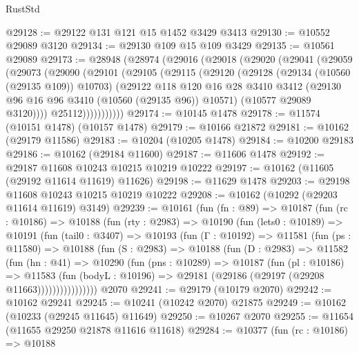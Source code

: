 \begin{lexlean}{RustStd}
\begin{coremodule}
@29128 := @29122 @131 @121 @15 @1452 @3429 @3413
@29130 := @10552 @29089 @3120
@29134 := @29130 @109 @15 @109 @3429
@29135 := @10561 @29089
@29173 := @28948
    (@28974
      (@29016
        (@29018
          (@29020
            (@29041
              (@29059
                (@29073
                  (@29090
                    (@29101
                      (@29105
                        (@29115
                          (@29120
                            (@29128
                              (@29134 (@10560 (@29135 @109)) @10703)
                              (@29122
                                @118
                                @120
                                @16
                                @28
                                @3410
                                @3412
                                (@29130 @96 @16 @96 @3410 (@10560 (@29135 @96)) @10571)
                                (@10577 @29089 @3120))))
                          @25112)))))))))))
@29174 := @10145 @1478
@29178 := @11574 (@10151 @1478) (@10157 @1478)
@29179 := @10166 @21872
@29181 := @10162 (@29179 @11586)
@29183 := @10204 (@10205 @1478)
@29184 := @10200 @29183
@29186 := @10162 (@29184 @11600)
@29187 := @11606 @1478
@29192 := @29187 @11608 @10243 @10215 @10219 @10222
@29197 := @10162 (@11605 (@29192 @11614 @11619) @11626)
@29198 := @11629 @1478
@29203 := @29198 @11608 @10243 @10215 @10219 @10222
@29208 := @10162 (@10292 (@29203 @11614 @11619) @3149)
@29239 := @10161
    (fun (fn : @89) =>
    @10187
      (fun (rc : @10186) =>
      @10188
        (fun (rty : @2983) =>
        @10190
          (fun (lets0 : @10189) =>
          @10191
            (fun (tail0 : @3407) =>
            @10193
              (fun (Γ : @10192) =>
              @11581
                (fun (ps : @11580) =>
                @10188
                  (fun (S : @2983) =>
                  @10188
                    (fun (D : @2983) =>
                    @11582
                      (fun (hn : @41) =>
                      @10290
                        (fun (pns : @10289) =>
                        @10187
                          (fun (pl : @10186) =>
                          @11583
                            (fun (bodyL : @10196) =>
                            @29181 (@29186 (@29197 (@29208 @11663))))))))))))))))
    @2070
@29241 := @29179 (@10179 @2070)
@29242 := @10162 @29241
@29245 := @10241 (@10242 @2070) @21875
@29249 := @10162 (@10233 (@29245 @11645) @11649)
@29250 := @10267 @2070
@29255 := @11654 (@11655 @29250 @21878 @11616 @11618)
@29284 := @10377
    (fun (rc : @10186) =>
    @10188

\end{coremodule}
\end{lexlean}
